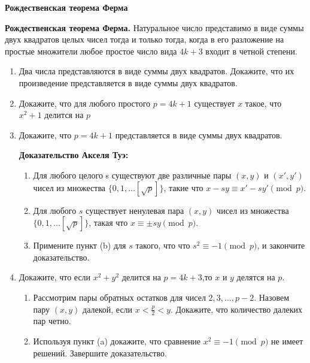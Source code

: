 \documentclass{article}
\begin{document}
\large
	

\begin{center}
\textbf{Рождественская теорема Ферма}
\end{center}

\textbf{Рождественская теорема Ферма.} Натуральное число представимо в виде суммы двух квадратов целых чисел тогда и только тогда, когда в его разложение на простые множители любое простое число вида $4k + 3$ входит в четной степени.

\begin{enumerate}[label*=\protect\fbox{\arabic{enumi}}]
	
	\item Два числа представляются в виде суммы двух квадратов. Докажите, что их произведение представляется в виде суммы двух квадратов.
	
	\item Докажите, что для любого простого $p = 4k + 1$ существует $x$ такое, что $x^2 + 1$ делится на $p$
	
	\item Докажите, что $p = 4k + 1$ представляется в виде суммы двух квадратов.
	
	\textbf{Доказательство Акселя Туэ:}
	\begin{enumerate}
		\item Для любого целого s существуют две различные пары $(x,y)$ и $(x',y')$ чисел из множества $\{0,1,\dotsc [\sqrt{p}]\}$, такие что $x-sy \equiv x'-sy' \pmod p$. 
		\item Для любого $s$ существует ненулевая пара $(x, y)$ чисел из множества $\{0,1,...[\sqrt{p}]\}$, такая что $x \equiv \pm sy \pmod p$. 
		\item Примените пункт (b) для $s$ такого, что что $s^2 \equiv -1 \pmod p$, и закончите доказательство.
	\end{enumerate}
	
	\item Докажите, что если $x^2+y^2$ делится на $p=4k+3$,то $x$ и $y$ делятся на $p$.
	\begin{enumerate}
		\item Рассмотрим пары обратных остатков для чисел $2, 3, \dotsc , p - 2$. Назовем пару $(x, y)$ далекой, если $x < \frac{p}{2} < y$. Докажите, что количество далеких пар четно.
		\item Используя пункт (a) докажите, что сравнение $x^2 \equiv -1 \pmod p$ не имеет решений. Завершите доказательство.
	\end{enumerate}
	

\end{enumerate}
\end{document}
